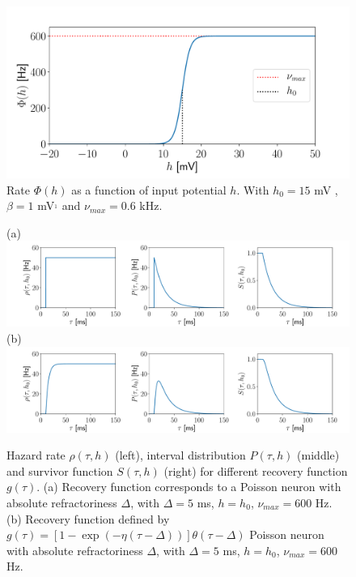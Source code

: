 \documentclass[12pt,twoside]{report}
\begin{document}
\begin{figure}[h!]
	\centering
	\includegraphics[width=0.8\linewidth]{phi_h.pdf}
	\caption{ Rate $\Phi(h)$ as a function of input potential $h$. With $h_0=15$ mV , $\beta=1$ mV$^{_1}$ and $\nu_{max}=0.6$ kHz.}
	\label{fig:phi_h}
\end{figure}


\begin{figure}[h!]
	(a) \\
	\includegraphics[width=\linewidth]{poissonRHOSP.pdf}
	(b)\\
	\includegraphics[width=\linewidth]{expRHOSP.pdf}
	\caption{Hazard rate $\rho(\tau,h)$ (left), interval distribution $P(\tau,h)$ (middle) and survivor function $S(\tau,h)$ (right) for different recovery function $g(\tau)$. (a) Recovery function corresponds to a Poisson neuron with absolute refractoriness $\Delta$, with $\Delta=5$ ms, $h=h_0$, $\nu_{max}=600$ Hz.  (b) Recovery function defined  by $ g(\tau)=\left[1-\exp(-\eta(\tau-\Delta))\right]\theta(\tau-\Delta)$ Poisson neuron with absolute refractoriness $\Delta$, with $\Delta=5$ ms, $h=h_0$, $\nu_{max}=600$ Hz.  }
	\label{fig:renewalprocess}
\end{figure}
\end{document}
